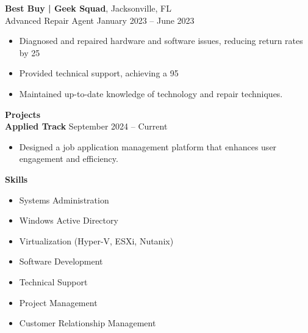 \documentclass[a4paper,10pt]{article}
\newcommand{\sectiontitle}[1]{
  \vspace{0.4cm}
  \textbf{#1} \\
}
\begin{document}
\textbf{Best Buy | Geek Squad}, Jacksonville, FL \\
Advanced Repair Agent  \hfill January 2023 – June 2023 \\
\begin{itemize}[leftmargin=*]
  \item Diagnosed and repaired hardware and software issues, reducing return rates by 25%
  \item Provided technical support, achieving a 95%
  \item Maintained up-to-date knowledge of technology and repair techniques.
\end{itemize}

\sectiontitle{Projects}
\textbf{Applied Track}  \hfill September 2024 – Current \\
\begin{itemize}[leftmargin=*]
  \item Designed a job application management platform that enhances user engagement and efficiency.
\end{itemize}

\sectiontitle{Skills}
\begin{itemize}[leftmargin=*]
  \item Systems Administration
  \item Windows Active Directory
  \item Virtualization (Hyper-V, ESXi, Nutanix)
  \item Software Development
  \item Technical Support
  \item Project Management
  \item Customer Relationship Management
\end{itemize}
\end{document}
